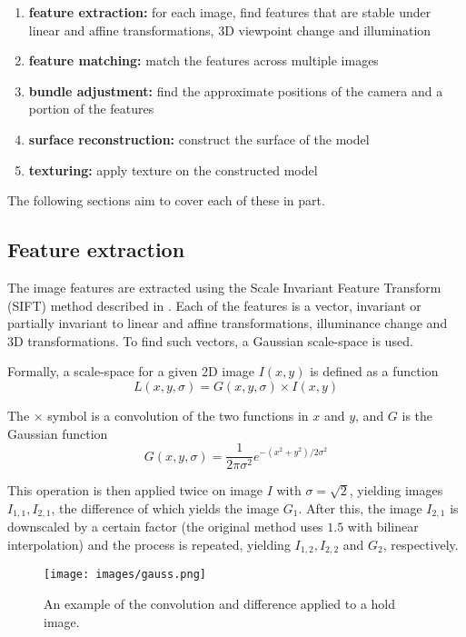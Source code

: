 \begin{enumerate}
	\item \textbf{feature extraction:} for each image, find features that are stable under linear and affine transformations, 3D viewpoint change and illumination
	\item \textbf{feature matching:} match the features across multiple images
	\item \textbf{bundle adjustment:} find the approximate positions of the camera and a portion of the features
	\item \textbf{surface reconstruction:} construct the surface of the model
	\item \textbf{texturing:} apply texture on the constructed model
\end{enumerate}

The following sections aim to cover each of these in part.

\subsection{Feature extraction}
The image features are extracted using the Scale Invariant Feature Transform (SIFT) method described in \citet{lowe1999object,lowe2004distinctive,snavely2008modeling}.
Each of the features is a vector, invariant or partially invariant to linear and affine transformations, illuminance change and 3D transformations.
To find such vectors, a Gaussian scale-space is used.

Formally, a scale-space for a given 2D image $I(x, y)$ is defined as a function
$$L(x, y, \sigma) = G(x, y, \sigma) \times I(x, y)$$

The $\times$ symbol is a convolution of the two functions in $x$ and $y$, and $G$ is the Gaussian function
$$G(x, y, \sigma) = \frac{1}{2\pi \sigma^2} e^{-(x^2 + y^2) / 2\sigma^2}$$

This operation is then applied twice on image $I$ with $\sigma = \sqrt{2}$, yielding images $I_{1,1}, I_{2,1}$, the difference of which yields the image $G_1$.
After this, the image $I_{2,1}$ is downscaled by a certain factor (the original method uses $1.5$ with bilinear interpolation) and the process is repeated, yielding $I_{1,2}, I_{2,2}$ and $G_2$, respectively.

\begin{figure}
	\centering
	\texttt{[image: images/gauss.png]}
	\caption{An example of the convolution and difference applied to a hold image.}
\end{figure}

